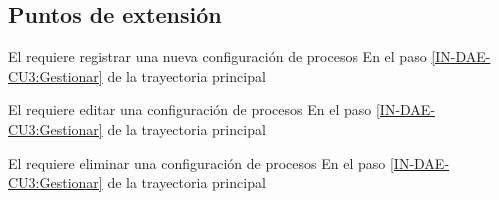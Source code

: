 \subsection{Puntos de extensión}

{El  requiere registrar una nueva configuración de procesos}
{En el paso \ref{IN-DAE-CU3:Gestionar} de la trayectoria principal}
{}

{El  requiere editar una configuración de procesos}
{En el paso \ref{IN-DAE-CU3:Gestionar} de la trayectoria principal}
{}

{El  requiere eliminar una configuración de procesos}
{En el paso \ref{IN-DAE-CU3:Gestionar} de la trayectoria principal}
{}
